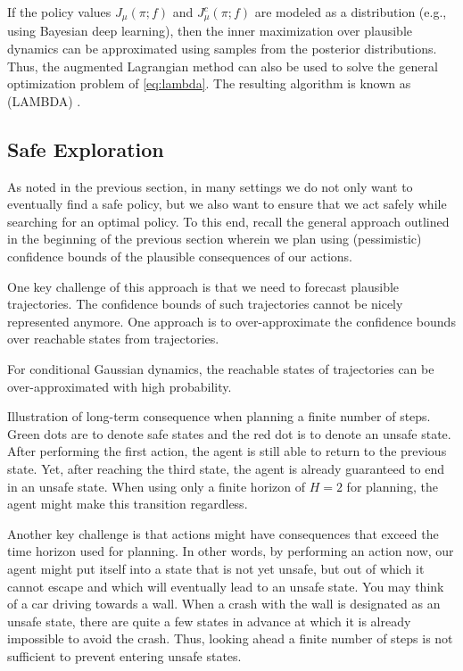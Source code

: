 If the policy values $J_\mu(\pi; f)$ and $J_\mu^{c}(\pi; f)$ are modeled as a distribution (e.g., using Bayesian deep learning), then the inner maximization over plausible dynamics can be approximated using samples from the posterior distributions.
Thus, the augmented Lagrangian method can also be used to solve the general optimization problem of \cref{eq:lambda}.
The resulting algorithm is known as  (LAMBDA) \citep{as2022constrained}.

\subsection{Safe Exploration}\label{sec:mbarl:exploration:safe}

As noted in the previous section, in many settings we do not only want to eventually find a safe policy, but we also want to ensure that we act safely while searching for an optimal policy.
To this end, recall the general approach outlined in the beginning of the previous section wherein we plan using (pessimistic) confidence bounds of the plausible consequences of our actions.

One key challenge of this approach is that we need to forecast plausible trajectories.
The confidence bounds of such trajectories cannot be nicely represented anymore.
One approach is to over-approximate the confidence bounds over reachable states from trajectories.

\begin{thm}
  For conditional Gaussian dynamics, the reachable states of trajectories can be over-approximated with high probability.
\end{thm}

\begin{marginfigure}
  \caption{Illustration of long-term consequence when planning a finite number of steps.
  Green dots are to denote safe states and the red dot is to denote an unsafe state.
  After performing the first action, the agent is still able to return to the previous state.
  Yet, after reaching the third state, the agent is already guaranteed to end in an unsafe state.
  When using only a finite horizon of $H=2$ for planning, the agent might make this transition regardless.}
\end{marginfigure}

Another key challenge is that actions might have consequences that exceed the time horizon used for planning.
In other words, by performing an action now, our agent might put itself into a state that is not yet unsafe, but out of which it cannot escape and which will eventually lead to an unsafe state.
You may think of a car driving towards a wall.
When a crash with the wall is designated as an unsafe state, there are quite a few states in advance at which it is already impossible to avoid the crash.
Thus, looking ahead a finite number of steps is not sufficient to prevent entering unsafe states.

